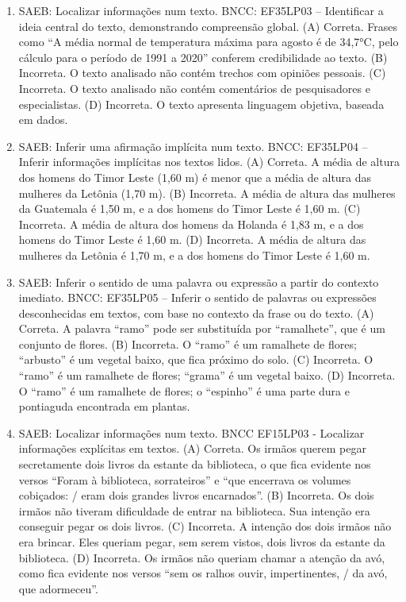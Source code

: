 \begin{enumerate}
\item
SAEB: Localizar informações num texto.
BNCC: EF35LP03 -- Identificar a ideia central do texto, demonstrando
compreensão global.
(A) Correta. Frases como ``A média normal de temperatura máxima para agosto é de 34,7°C, pelo cálculo para o período de 1991 a 2020'' 
 conferem credibilidade ao texto.
(B) Incorreta. O texto analisado não contém trechos com opiniões pessoais.
(C) Incorreta. O texto analisado não contém comentários de pesquisadores e especialistas.
(D)  Incorreta. O texto apresenta linguagem objetiva, baseada em dados.

\item
SAEB: Inferir uma afirmação implícita num texto. BNCC: EF35LP04 -- Inferir informações implícitas nos textos lidos. 
(A) Correta. A média de altura dos homens do Timor Leste (1,60 m) é menor que a média de altura das mulheres da Letônia (1,70 m). 
(B) Incorreta. A média de altura das mulheres da Guatemala é 1,50 m, e a dos homens do Timor Leste é 1,60 m. 
(C) Incorreta. A média de altura dos homens da Holanda é 1,83 m, e a dos homens do Timor Leste é 1,60 m. 
(D) Incorreta. A média de altura das mulheres da Letônia é 1,70 m, e a dos homens do Timor Leste é 1,60 m.

\item
SAEB: Inferir o sentido de uma palavra ou expressão a partir do contexto imediato. BNCC: EF35LP05 -- Inferir o sentido de palavras ou expressões desconhecidas em textos, com base no contexto da frase ou do texto. 
(A) Correta. A palavra ``ramo'' pode ser substituída por ``ramalhete'', que é um conjunto de flores. 
(B) Incorreta. O ``ramo'' é um ramalhete de flores; ``arbusto'' é um vegetal baixo, que fica próximo do solo. 
(C) Incorreta. O ``ramo'' é um ramalhete de flores; ``grama'' é um vegetal baixo. 
(D)  Incorreta. O ``ramo'' é um ramalhete de flores; o ``espinho'' é uma parte dura e pontiaguda encontrada em  plantas.

\item
SAEB: Localizar informações num texto. BNCC EF15LP03 - Localizar informações explícitas em textos. 
(A) Correta. Os irmãos querem pegar secretamente dois livros da estante da biblioteca, o que fica evidente nos versos  ``Foram à biblioteca, sorrateiros'' e ``que encerrava os volumes cobiçados: / eram dois grandes livros encarnados''. 
(B) Incorreta. Os dois irmãos não tiveram dificuldade de entrar na biblioteca. Sua intenção era conseguir pegar os dois livros. 
(C) Incorreta. A intenção dos dois irmãos não era brincar. Eles queriam pegar, sem serem vistos, dois livros da estante da biblioteca. 
(D)  Incorreta. Os irmãos não queriam chamar a atenção da avó, como fica evidente nos versos ``sem os ralhos ouvir, impertinentes, / da avó, que adormeceu''.


\end{enumerate}
